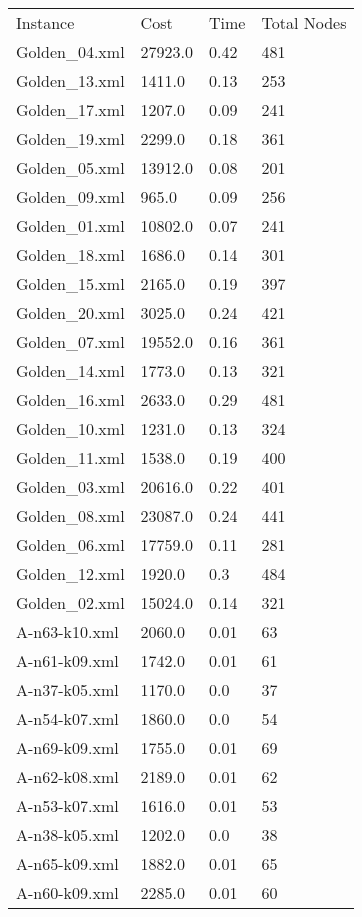 \documentclass[12pt]{article}
\begin{document}
\begin{appendices}
\begin{table}[]
	\begin{tabular}{llll}
	Instance & Cost & Time & Total Nodes \\
	Golden\_04.xml & 27923.0 & 0.42 & 481 \\
	Golden\_13.xml & 1411.0 & 0.13 & 253 \\
	Golden\_17.xml & 1207.0 & 0.09 & 241 \\
	Golden\_19.xml & 2299.0 & 0.18 & 361 \\
	Golden\_05.xml & 13912.0 & 0.08 & 201 \\
	Golden\_09.xml & 965.0 & 0.09 & 256 \\
	Golden\_01.xml & 10802.0 & 0.07 & 241 \\
	Golden\_18.xml & 1686.0 & 0.14 & 301 \\
	Golden\_15.xml & 2165.0 & 0.19 & 397 \\
	Golden\_20.xml & 3025.0 & 0.24 & 421 \\
	Golden\_07.xml & 19552.0 & 0.16 & 361 \\
	Golden\_14.xml & 1773.0 & 0.13 & 321 \\
	Golden\_16.xml & 2633.0 & 0.29 & 481 \\
	Golden\_10.xml & 1231.0 & 0.13 & 324 \\
	Golden\_11.xml & 1538.0 & 0.19 & 400 \\
	Golden\_03.xml & 20616.0 & 0.22 & 401 \\
	Golden\_08.xml & 23087.0 & 0.24 & 441 \\
	Golden\_06.xml & 17759.0 & 0.11 & 281 \\
	Golden\_12.xml & 1920.0 & 0.3 & 484 \\
	Golden\_02.xml & 15024.0 & 0.14 & 321 \\
	A-n63-k10.xml & 2060.0 & 0.01 & 63 \\
	A-n61-k09.xml & 1742.0 & 0.01 & 61 \\
	A-n37-k05.xml & 1170.0 & 0.0 & 37 \\
	A-n54-k07.xml & 1860.0 & 0.0 & 54 \\
	A-n69-k09.xml & 1755.0 & 0.01 & 69 \\
	A-n62-k08.xml & 2189.0 & 0.01 & 62 \\
	A-n53-k07.xml & 1616.0 & 0.01 & 53 \\
	A-n38-k05.xml & 1202.0 & 0.0 & 38 \\
	A-n65-k09.xml & 1882.0 & 0.01 & 65 \\
	A-n60-k09.xml & 2285.0 & 0.01 & 60 \\

\end{tabular}
\end{table}
\end{appendices}
\end{document}
